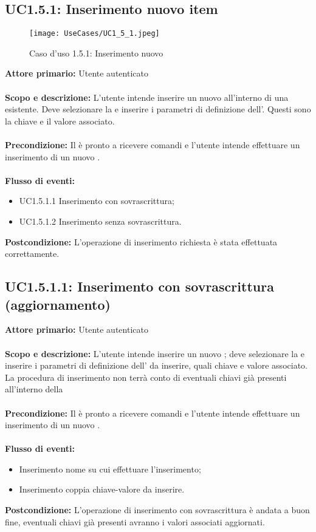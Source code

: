 \documentclass{scalatekids-article}
\begin{document}
\subsection{UC1.5.1: Inserimento nuovo item}
\begin{figure}[H]
  \begin{center}
    \texttt{[image: UseCases/UC1\_5\_1.jpeg]}
    \caption{Caso d'uso 1.5.1: Inserimento nuovo }
  \end{center}
\end{figure}
\textbf{Attore primario:} Utente autenticato\\ \\
\textbf{Scopo e descrizione:} L'utente intende inserire un nuovo  all'interno di una  esistente. Deve selezionare la  e inserire i parametri di definizione dell'. Questi sono la chiave e il valore associato.\\ \\
\textbf{Precondizione:} Il  è pronto a ricevere comandi e l'utente intende effettuare un inserimento di un nuovo .\\ \\
\textbf{Flusso di eventi:}
\begin{itemize}
\item UC1.5.1.1 Inserimento con sovrascrittura;
\item UC1.5.1.2 Inserimento senza sovrascrittura.
\end{itemize}
\textbf{Postcondizione:} L'operazione di inserimento richiesta è stata effettuata correttamente.
\subsection{UC1.5.1.1: Inserimento con sovrascrittura (aggiornamento)}
\textbf{Attore primario:} Utente autenticato\\ \\
\textbf{Scopo e descrizione:} L'utente intende inserire un nuovo ; deve selezionare la  e inserire i parametri di definizione dell' da inserire, quali chiave e valore associato. La procedura di inserimento non terrà conto di
eventuali chiavi già presenti all'interno della \\ \\
\textbf{Precondizione:} Il  è pronto a ricevere comandi e l'utente intende effettuare un inserimento di un nuovo .\\ \\
\textbf{Flusso di eventi:}
\begin{itemize}
\item Inserimento nome  su cui effettuare l'inserimento;
\item Inserimento coppia chiave-valore da inserire.
\end{itemize}
\textbf{Postcondizione:} L'operazione di inserimento con sovrascrittura è andata a buon fine, eventuali chiavi già presenti avranno i valori associati aggiornati.
\end{document}
